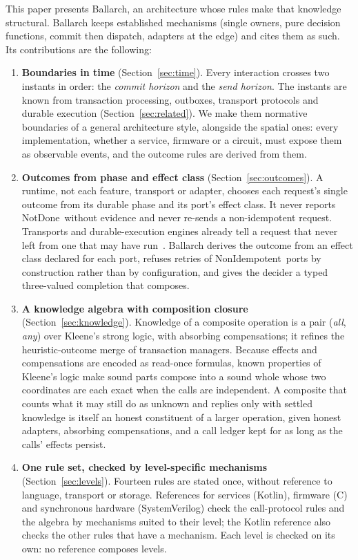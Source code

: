 \documentclass[11pt]{article}
\theoremstyle{definition}
\theoremstyle{plain}
\newcommand{\NotDone}{\textsf{NotDone}}
\newcommand{\NonIdem}{\textsf{NonIdempotent}}
\begin{document}
This paper presents Ballarch, an architecture whose rules make that knowledge structural. Ballarch keeps established mechanisms (single owners, pure decision functions, commit then dispatch, adapters at the edge) and cites them as such. Its contributions are the following:
\begin{enumerate}[leftmargin=*]
  \item \textbf{Boundaries in time} (Section~\ref{sec:time}). Every interaction crosses two instants in order: the \emph{commit horizon} and the \emph{send horizon}. The instants are known from transaction processing, outboxes, transport protocols and durable execution (Section~\ref{sec:related}). We make them normative boundaries of a general architecture style, alongside the spatial ones: every implementation, whether a service, firmware or a circuit, must expose them as observable events, and the outcome rules are derived from them.
  \item \textbf{Outcomes from phase and effect class} (Section~\ref{sec:outcomes}). A runtime, not each feature, transport or adapter, chooses each request's single outcome from its durable phase and its port's effect class. It never reports \NotDone\ without evidence and never re-sends a non-idempotent request. Transports and durable-execution engines already tell a request that never left from one that may have run~\citep{rfc9110,rfc9113,grpcA6,TemporalTimeouts,AWSDurableSteps}. Ballarch derives the outcome from an effect class declared for each port, refuses retries of \NonIdem\ ports by construction rather than by configuration, and gives the decider a typed three-valued completion that composes.
  \item \textbf{A knowledge algebra with composition closure} (Section~\ref{sec:knowledge}). Knowledge of a composite operation is a pair (\emph{all}, \emph{any}) over Kleene's strong logic, with absorbing compensations; it refines the heuristic-outcome merge of transaction managers. Because effects and compensations are encoded as read-once formulas, known properties of Kleene's logic make sound parts compose into a sound whole whose two coordinates are each exact when the calls are independent. A composite that counts what it may still do as unknown and replies only with settled knowledge is itself an honest constituent of a larger operation, given honest adapters, absorbing compensations, and a call ledger kept for as long as the calls' effects persist.
  \item \textbf{One rule set, checked by level-specific mechanisms} (Section~\ref{sec:levels}). Fourteen rules are stated once, without reference to language, transport or storage. References for services (Kotlin), firmware (C) and synchronous hardware (SystemVerilog) check the call-protocol rules and the algebra by mechanisms suited to their level; the Kotlin reference also checks the other rules that have a mechanism. Each level is checked on its own: no reference composes levels.

\end{enumerate}
\end{document}
